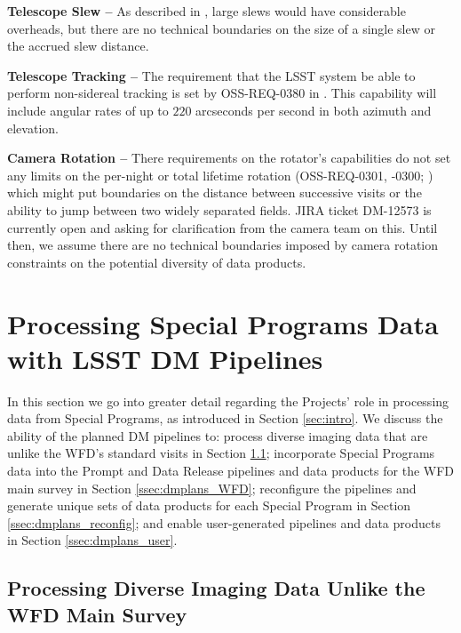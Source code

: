 \documentclass[DM,lsstdoc,toc]{lsstdoc}
\begin{document}
{\bf Telescope Slew -- } As described in , large slews would have considerable overheads, but there are no technical boundaries on the size of a single slew or the accrued slew distance.

{\bf Telescope Tracking --} The requirement that the LSST system be able to perform non-sidereal tracking is set by OSS-REQ-0380 in . This capability will include angular rates of up to $220$ arcseconds per second in both azimuth and elevation. 

{\bf Camera Rotation -- } There requirements on the rotator's capabilities do not set any limits on the per-night or total lifetime rotation (OSS-REQ-0301, -0300; ) which might put boundaries on the distance between successive visits or the ability to jump between two widely separated fields. JIRA ticket DM-12573 is currently open and asking for clarification from the camera team on this. Until then, we assume there are no technical boundaries imposed by camera rotation constraints on the potential diversity of data products. 


\clearpage
\section{Processing Special Programs Data with LSST DM Pipelines} \label{sec:dmplans}

In this section we go into greater detail regarding the Projects' role in processing data from Special Programs, as introduced in Section \ref{sec:intro}. We discuss the ability of the planned DM pipelines to: process diverse imaging data that are unlike the WFD's standard visits in Section \ref{ssec:dmplans_NSV}; incorporate Special Programs data into the Prompt and Data Release pipelines and data products for the WFD main survey in Section \ref{ssec:dmplans_WFD}; reconfigure the pipelines and generate unique sets of data products for each Special Program in Section \ref{ssec:dmplans_reconfig}; and enable user-generated pipelines and data products in Section \ref{ssec:dmplans_user}.

\subsection{Processing Diverse Imaging Data Unlike the WFD Main Survey}\label{ssec:dmplans_NSV}
\end{document}
